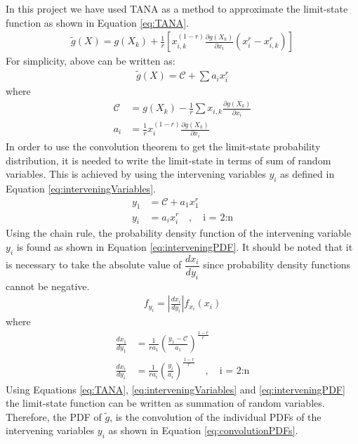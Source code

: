 \documentclass[paper=a4, fontsize=12pt]{scrartcl} %
\begin{document}
In this project we have used TANA as a method to approximate the limit-state function as shown in Equation \eqref{eq:TANA}. 
%
\begin{gather}\label{eq:TANA}
	\tilde{g}(X) = g(X_k) + \frac{1}{r}
	\left[
	x_{i,k}^{(1-r)} \frac{\partial g(X_k)}{\partial x_i} \left( x_i^r - x_{i,k}^r \right)
	\right]
\end{gather}
%
For simplicity, above can be written as:
%
\begin{gather*}
	\tilde{g}(X) = \mathcal{C} + \sum a_i x_i^r
\end{gather*}
%
where
%
\begin{align*}
	\mathcal{C} &= g(X_k) - \frac{1}{r} \sum x_{i,k} \frac{\partial g(X_k)}{\partial x_i}
	\\
	a_i &= \frac{1}{r} x_i^{(1-r)} \frac{\partial g(X_k)}{\partial x_i}
\end{align*}
%
In order to use the convolution theorem to get the limit-state probability distribution, it is needed to write the limit-state in terms of sum of random variables. This is achieved by using the intervening variables $y_i$ as defined in Equation \eqref{eq:interveningVariables}.
%
\begin{subequations}\label{eq:interveningVariables}
\begin{align}
	y_1 &= \mathcal{C} + a_1 x_1^r
	\\
	y_i &= a_i x_i^r \quad , \quad \text{i = 2:n}
\end{align}
\end{subequations}
%
Using the chain rule, the probability density function of the intervening variable $y_i$ is found as shown in Equation \eqref{eq:interveningPDF}. It should be noted that it is necessary to take the absolute value of $\dfrac{dx_i}{dy_i}$ since probability density functions cannot be negative.
%
\begin{gather}\label{eq:interveningPDF}
	f_{y_i} = \left| \frac{dx_i}{dy_i} \right| f_{x_i} \left( x_i \right)
\end{gather}
%
where
%
\begin{subequations}
\begin{align*}
	\frac{dx_1}{dy_1} &= \frac{1}{ra_1} \left( \frac{y_1 - \mathcal{C}}{a_1} 
		\right) ^ \frac{1-r}{r}
	\\
	\frac{dx_i}{dy_i} &= \frac{1}{ra_i} \left( \frac{y_i}{a_i} \right)^\frac{1-r}
		{r} \quad , \quad \text{i = 2:n}
\end{align*}
\end{subequations}
%
Using Equations \eqref{eq:TANA}, \eqref{eq:interveningVariables} and \eqref{eq:interveningPDF} the limit-state function can be written as summation of random variables. Therefore, the PDF of $\tilde{g}$, is the convolution of the individual PDFs of the intervening variables $y_i$ as shown in Equation \eqref{eq:convolutionPDFs}.
\end{document}
